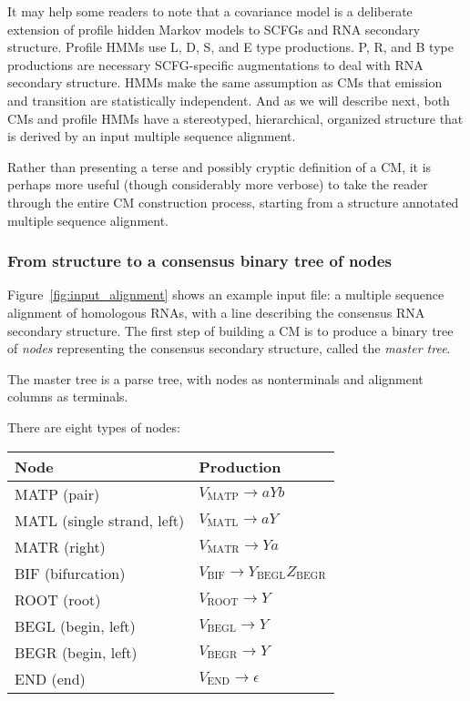 \documentclass[11pt]{article}
\begin{document}
It may help some readers to note that a covariance model is a
deliberate extension of profile hidden Markov models to SCFGs and RNA
secondary structure. Profile HMMs use L, D, S, and E type
productions. P, R, and B type productions are necessary SCFG-specific
augmentations to deal with RNA secondary structure. HMMs make the same
assumption as CMs that emission and transition are statistically
independent. And as we will describe next, both CMs and profile HMMs
have a stereotyped, hierarchical, organized structure that is derived
by an input multiple sequence alignment.

Rather than presenting a terse and possibly cryptic definition of a
CM, it is perhaps more useful (though considerably more verbose) to
take the reader through the entire CM construction process, starting
from a structure annotated multiple sequence alignment.

\subsubsection{From structure to a consensus binary tree of nodes}

Figure~\ref{fig:input_alignment} shows an example input file: a
multiple sequence alignment of homologous RNAs, with a line describing
the consensus RNA secondary structure. The first step of building a CM
is to produce a binary tree of \emph{nodes} representing the consensus
secondary structure, called the \emph{master tree}. 

The master tree is a parse tree, with nodes as nonterminals and
alignment columns as terminals. 

There are eight types of nodes:

\begin{tabular}{ll}
Node                         &  Production           \\ \hline
MATP  (pair)                 & $V_{\mbox{MATP}} \rightarrow a Y b$  \\
MATL  (single strand, left)  & $V_{\mbox{MATL}} \rightarrow a Y$   \\
MATR  (right)                & $V_{\mbox{MATR}} \rightarrow Y a$   \\
BIF   (bifurcation)          & $V_{\mbox{BIF}}  \rightarrow Y_{\mbox{BEGL}} Z_{\mbox{BEGR}}$ \\
ROOT  (root)                 & $V_{\mbox{ROOT}} \rightarrow Y$       \\
BEGL  (begin, left)          & $V_{\mbox{BEGL}} \rightarrow Y$       \\
BEGR  (begin, left)          & $V_{\mbox{BEGR}} \rightarrow Y$       \\
END   (end)                  & $V_{\mbox{END}}  \rightarrow \epsilon$ \\ \hline
\end{tabular}
 
\end{document}
